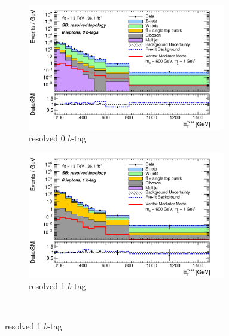 \begin{figure}[htbp]
  \begin{subfigure}{0.49\textwidth}
    \centering
    \includegraphics[width=0.95\textwidth]{figures/monoV/postfit/monoV_0lep_0tag_resolved_massFail_met_XS.pdf}
    \caption{resolved 0 \(b\)-tag}
  \end{subfigure}
  \begin{subfigure}{0.49\textwidth}
    \centering
    \includegraphics[width=0.95\textwidth]{figures/monoV/postfit/monoV_0lep_1tag_resolved_massFail_met_XS.pdf}
    \caption{resolved 1 \(b\)-tag}
  \end{subfigure} \\


\end{figure}
